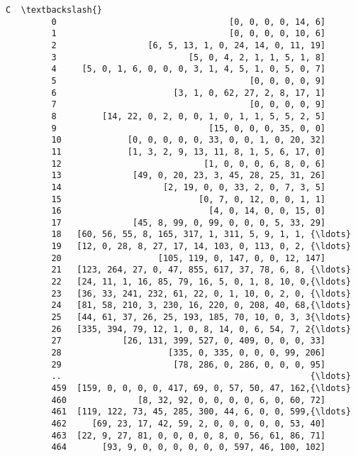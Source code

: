 \documentclass[11pt]{article}
\begin{document}
\begin{Verbatim}[commandchars=\\\{\}]
                                                              C  \textbackslash{}
         0                                  [0, 0, 0, 0, 14, 6]   
         1                                  [0, 0, 0, 0, 10, 6]   
         2                  [6, 5, 13, 1, 0, 24, 14, 0, 11, 19]   
         3                          [5, 0, 4, 2, 1, 1, 5, 1, 8]   
         4     [5, 0, 1, 6, 0, 0, 0, 3, 1, 4, 5, 1, 0, 5, 0, 7]   
         5                                      [0, 0, 0, 0, 9]   
         6                       [3, 1, 0, 62, 27, 2, 8, 17, 1]   
         7                                      [0, 0, 0, 0, 9]   
         8         [14, 22, 0, 2, 0, 0, 1, 0, 1, 1, 5, 5, 2, 5]   
         9                              [15, 0, 0, 0, 35, 0, 0]   
         10             [0, 0, 0, 0, 0, 33, 0, 0, 1, 0, 20, 32]   
         11             [1, 3, 2, 9, 13, 11, 8, 1, 5, 6, 17, 0]   
         12                            [1, 0, 0, 0, 6, 8, 0, 6]   
         13              [49, 0, 20, 23, 3, 45, 28, 25, 31, 26]   
         14                    [2, 19, 0, 0, 33, 2, 0, 7, 3, 5]   
         15                           [0, 7, 0, 12, 0, 0, 1, 1]   
         16                             [4, 0, 14, 0, 0, 15, 0]   
         17              [45, 8, 99, 0, 99, 0, 0, 0, 5, 33, 29]   
         18   [60, 56, 55, 8, 165, 317, 1, 311, 5, 9, 1, 1, {\ldots}   
         19   [12, 0, 28, 8, 27, 17, 14, 103, 0, 113, 0, 2, {\ldots}   
         20                   [105, 119, 0, 147, 0, 0, 12, 147]   
         21   [123, 264, 27, 0, 47, 855, 617, 37, 78, 6, 8, {\ldots}   
         22   [24, 11, 1, 16, 85, 79, 16, 5, 0, 1, 8, 10, 0,{\ldots}   
         23   [36, 33, 241, 232, 61, 22, 0, 1, 10, 0, 2, 0, {\ldots}   
         24   [81, 58, 210, 3, 230, 16, 220, 0, 208, 40, 68,{\ldots}   
         25   [44, 61, 37, 26, 25, 193, 185, 70, 10, 0, 3, 3{\ldots}   
         26   [335, 394, 79, 12, 1, 0, 8, 14, 0, 6, 54, 7, 2{\ldots}   
         27            [26, 131, 399, 527, 0, 409, 0, 0, 0, 33]   
         28                     [335, 0, 335, 0, 0, 0, 99, 206]   
         29                      [78, 286, 0, 286, 0, 0, 0, 95]   
         ..                                                 {\ldots}   
         459  [159, 0, 0, 0, 0, 417, 69, 0, 57, 50, 47, 162,{\ldots}   
         460              [8, 32, 92, 0, 0, 0, 0, 6, 0, 60, 72]   
         461  [119, 122, 73, 45, 285, 300, 44, 6, 0, 0, 599,{\ldots}   
         462     [69, 23, 17, 42, 59, 2, 0, 0, 0, 0, 0, 53, 40]   
         463  [22, 9, 27, 81, 0, 0, 0, 0, 8, 0, 56, 61, 86, 71]   
         464       [93, 9, 0, 0, 0, 0, 0, 0, 597, 46, 100, 102]   

\end{Verbatim}
\end{document}
